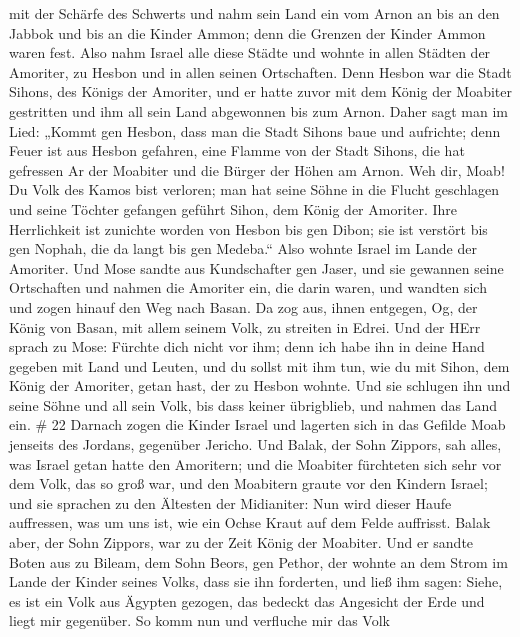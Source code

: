 mit der Schärfe des Schwerts und nahm sein Land ein vom Arnon an bis an
den Jabbok und bis an die Kinder Ammon; denn die Grenzen der Kinder
Ammon waren fest.  Also nahm Israel alle diese Städte und
wohnte in allen Städten der Amoriter, zu Hesbon und in allen seinen
Ortschaften.  Denn Hesbon war die Stadt Sihons, des Königs
der Amoriter, und er hatte zuvor mit dem König der Moabiter gestritten
und ihm all sein Land abgewonnen bis zum Arnon.  Daher sagt
man im Lied: „Kommt gen Hesbon, dass man die Stadt Sihons baue und
aufrichte;  denn Feuer ist aus Hesbon gefahren, eine Flamme
von der Stadt Sihons, die hat gefressen Ar der Moabiter und die Bürger
der Höhen am Arnon.  Weh dir, Moab! Du Volk des Kamos bist
verloren; man hat seine Söhne in die Flucht geschlagen und seine Töchter
gefangen geführt Sihon, dem König der Amoriter.  Ihre
Herrlichkeit ist zunichte worden von Hesbon bis gen Dibon; sie ist
verstört bis gen Nophah, die da langt bis gen Medeba.`` 
Also wohnte Israel im Lande der Amoriter.  Und Mose sandte
aus Kundschafter gen Jaser, und sie gewannen seine Ortschaften und
nahmen die Amoriter ein, die darin waren,  und wandten sich
und zogen hinauf den Weg nach Basan. Da zog aus, ihnen entgegen, Og, der
König von Basan, mit allem seinem Volk, zu streiten in Edrei.
 Und der HErr sprach zu Mose: Fürchte dich nicht vor ihm;
denn ich habe ihn in deine Hand gegeben mit Land und Leuten, und du
sollst mit ihm tun, wie du mit Sihon, dem König der Amoriter, getan
hast, der zu Hesbon wohnte.  Und sie schlugen ihn und seine
Söhne und all sein Volk, bis dass keiner übrigblieb, und nahmen das Land
ein. \# 22  Darnach zogen die Kinder Israel und lagerten
sich in das Gefilde Moab jenseits des Jordans, gegenüber Jericho.
 Und Balak, der Sohn Zippors, sah alles, was Israel getan
hatte den Amoritern;  und die Moabiter fürchteten sich sehr
vor dem Volk, das so groß war, und den Moabitern graute vor den Kindern
Israel;  und sie sprachen zu den Ältesten der Midianiter:
Nun wird dieser Haufe auffressen, was um uns ist, wie ein Ochse Kraut
auf dem Felde auffrisst. Balak aber, der Sohn Zippors, war zu der Zeit
König der Moabiter.  Und er sandte Boten aus zu Bileam, dem
Sohn Beors, gen Pethor, der wohnte an dem Strom im Lande der Kinder
seines Volks, dass sie ihn forderten, und ließ ihm sagen: Siehe, es ist
ein Volk aus Ägypten gezogen, das bedeckt das Angesicht der Erde und
liegt mir gegenüber.  So komm nun und verfluche mir das Volk
